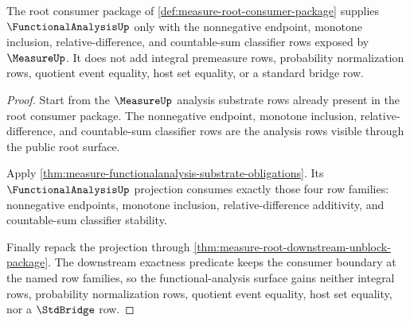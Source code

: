 \begin{theorem}
\label{thm:measure-functionalanalysis-consumer-rows}
The root consumer package of
\autoref{def:measure-root-consumer-package} supplies $\FunctionalAnalysisUp$
only with the nonnegative endpoint, monotone inclusion, relative-difference,
and countable-sum classifier rows exposed by $\MeasureUp$. It does not add
integral premeasure rows, probability normalization rows, quotient event
equality, host set equality, or a standard bridge row.
\end{theorem}
\begin{proof}
Start from the $\MeasureUp$ analysis substrate rows already present in the
root consumer package. The nonnegative endpoint, monotone inclusion,
relative-difference, and countable-sum classifier rows are the analysis rows
visible through the public root surface.

Apply \autoref{thm:measure-functionalanalysis-substrate-obligations}. Its
$\FunctionalAnalysisUp$ projection consumes exactly those four row families:
nonnegative endpoints, monotone inclusion, relative-difference additivity,
and countable-sum classifier stability.

Finally repack the projection through
\autoref{thm:measure-root-downstream-unblock-package}. The downstream
exactness predicate keeps the consumer boundary at the named row families, so
the functional-analysis surface gains neither integral rows, probability
normalization rows, quotient event equality, host set equality, nor a
$\StdBridge$ row.
\end{proof}
